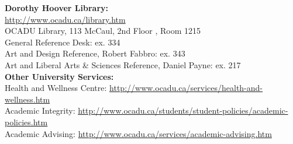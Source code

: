 \documentclass[10pt]{article}
\begin{document}
%
\textbf{Dorothy Hoover Library:}\\
\url{http://www.ocadu.ca/library.htm} \\
OCADU Library, 113 McCaul, 2nd Floor , Room 1215 \\
General Reference Desk: ex. 334 \\
Art and Design Reference, Robert Fabbro: ex. 343 \\
Art and Liberal Arts \& Sciences Reference, Daniel Payne: ex. 217 \\
%
\textbf{Other University Services:}\\
Health and Wellness Centre: \url{http://www.ocadu.ca/services/health-and-wellness.htm} \\
Academic Integrity: \url{http://www.ocadu.ca/students/student-policies/academic-policies.htm} \\
Academic Advising: \url{http://www.ocadu.ca/services/academic-advising.htm} \\


%
\end{document}
